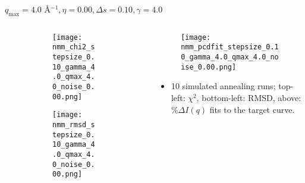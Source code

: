 \documentclass{beamer}
\begin{document}
\begin{frame}{$ q_{\textrm{max}}=4.0 $ \AA $^{-1}, \eta=0.00, \Delta s=0.10, \gamma=4.0$}
	\begin{columns}
		\begin{column}{.5\textwidth}
			\begin{figure}[H]
			\centering
			\begin{subfigure}[b]{\textwidth}
				\centering
				\texttt{[image: nmm\_chi2\_stepsize\_0.10\_gamma\_4.0\_qmax\_4.0\_noise\_0.00.png]}
				\label{fig:}
			\end{subfigure}
			\begin{subfigure}[b]{\textwidth}
				\centering
				\texttt{[image: nmm\_rmsd\_stepsize\_0.10\_gamma\_4.0\_qmax\_4.0\_noise\_0.00.png]}
				\label{fig:}
			\end{subfigure}
			\end{figure}
		\end{column}
		\begin{column}{.5\textwidth}
			\begin{figure}[H]
				\centering
				\texttt{[image: nmm\_pcdfit\_stepsize\_0.10\_gamma\_4.0\_qmax\_4.0\_noise\_0.00.png]}
				\label{fig:}
			\end{figure}
			\begin{itemize}
				\item 10 simulated annealing runs; top-left: $\chi^2$, bottom-left: RMSD, above: $\%\Delta I(q)$ fits to the target curve.
			\end{itemize}
		\end{column}
	\end{columns}
\end{frame}
 
\end{document}
